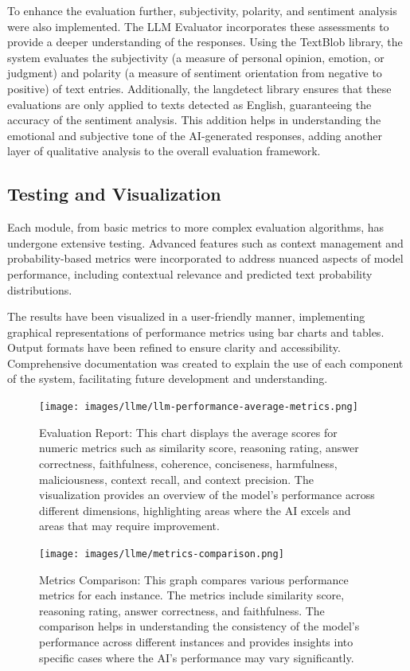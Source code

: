 To enhance the evaluation further, subjectivity, polarity, and sentiment analysis were also implemented. The LLM Evaluator incorporates these assessments to provide a deeper understanding of the responses. Using the TextBlob library, the system evaluates the subjectivity (a measure of personal opinion, emotion, or judgment) and polarity (a measure of sentiment orientation from negative to positive) of text entries. Additionally, the langdetect library ensures that these evaluations are only applied to texts detected as English, guaranteeing the accuracy of the sentiment analysis. This addition helps in understanding the emotional and subjective tone of the AI-generated responses, adding another layer of qualitative analysis to the overall evaluation framework.

\subsection{Testing and Visualization}

Each module, from basic metrics to more complex evaluation algorithms, has undergone extensive testing. Advanced features such as context management and probability-based metrics were incorporated to address nuanced aspects of model performance, including contextual relevance and predicted text probability distributions.

The results have been visualized in a user-friendly manner, implementing graphical representations of performance metrics using bar charts and tables. Output formats have been refined to ensure clarity and accessibility. Comprehensive documentation was created to explain the use of each component of the system, facilitating future development and understanding.

\begin{figure}[h!]
    \centering
    \texttt{[image: images/llme/llm-performance-average-metrics.png]}
    \caption{Evaluation Report: This chart displays the average scores for numeric metrics such as similarity score, reasoning rating, answer correctness, faithfulness, coherence, conciseness, harmfulness, maliciousness, context recall, and context precision. The visualization provides an overview of the model's performance across different dimensions, highlighting areas where the AI excels and areas that may require improvement.}
    \label{fig:llm-performance-average-metrics}
\end{figure}

\begin{figure}[h!]
    \centering
    \texttt{[image: images/llme/metrics-comparison.png]}
    \caption{Metrics Comparison: This graph compares various performance metrics for each instance. The metrics include similarity score, reasoning rating, answer correctness, and faithfulness. The comparison helps in understanding the consistency of the model's performance across different instances and provides insights into specific cases where the AI's performance may vary significantly.}
    \label{fig:metrics-comparison}
\end{figure}


